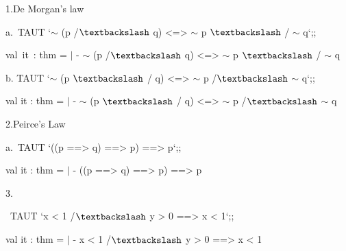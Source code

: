 \documentclass[12pt]{article}
\renewcommand{\_}{\kern-1.5pt\textunderscore\kern-1.5pt}
\begin{document}
{\fontsize{13pt}{15.6pt}\selectfont 1.De Morgan’s law\par}\par

{\fontsize{13pt}{15.6pt}\selectfont a.\  TAUT `$ \sim $ (p /$\textbackslash$  q) <=> $ \sim $ p $\textbackslash$ / $ \sim $ q`;;\par}\par

{\fontsize{13pt}{15.6pt}\selectfont val\ it\ : thm = $ \vert $ - $ \sim $ (p /$\textbackslash$  q) <=>  $ \sim $ p $\textbackslash$ /  $ \sim $ q\par}\par

{\fontsize{13pt}{15.6pt}\selectfont b. TAUT `$ \sim $ (p $\textbackslash$ / q) <=> $ \sim $ p /$\textbackslash$  $ \sim $ q`;;\par}\par

{\fontsize{13pt}{15.6pt}\selectfont val it : thm = $ \vert $ - $ \sim $ (p $\textbackslash$ / q) <=> $ \sim $ p /$\textbackslash$  $ \sim $ q\par}\par

{\fontsize{9pt}{10.8pt}\selectfont  \par}\par

{\fontsize{13pt}{15.6pt}\selectfont 2.Peirce’s Law\par}\par

{\fontsize{13pt}{15.6pt}\selectfont a.\  TAUT `((p ==> q) ==> p) ==> p`;;\par}\par

{\fontsize{14pt}{16.8pt}\selectfont val it : thm = $ \vert $ - ((p ==> q) ==> p) ==> p\par}\par

 \par

3. {\fontsize{13pt}{15.6pt}\selectfont \ TAUT  `x < 1 /$\textbackslash$  y > 0 ==> x < 1`;;\par}\par

{\fontsize{14pt}{16.8pt}\selectfont val it : thm = $ \vert $ - x < 1 /$\textbackslash$  y > 0 ==> x < 1\par}\par

{\fontsize{14pt}{16.8pt}\selectfont  \par}\par
\end{document}
